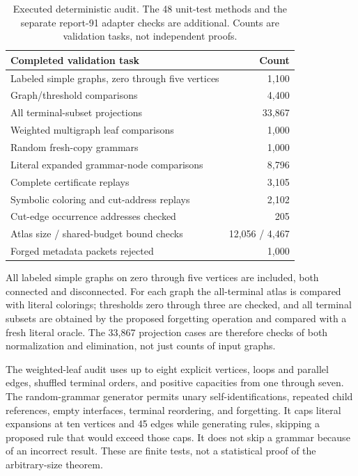 \documentclass[11pt,letterpaper]{article}
\theoremstyle{definition}
\theoremstyle{remark}\newtheorem{remark}[theorem]{Remark}
\begin{document}
\begin{table}[htbp]
\centering\small
\begin{tabular}{@{}lr@{}}
\toprule
Completed validation task & Count\\
\midrule
Labeled simple graphs, zero through five vertices & 1,100\\
Graph/threshold comparisons & 4,400\\
All terminal-subset projections & 33,867\\
Weighted multigraph leaf comparisons & 1,000\\
Random fresh-copy grammars & 1,000\\
Literal expanded grammar-node comparisons & 8,796\\
Complete certificate replays & 3,105\\
Symbolic coloring and cut-address replays & 2,102\\
Cut-edge occurrence addresses checked & 205\\
Atlas size / shared-budget bound checks & 12,056 / 4,467\\
Forged metadata packets rejected & 1,000\\
\bottomrule
\end{tabular}
\caption{Executed deterministic audit. The 48 unit-test methods and the separate report-91 adapter checks are additional. Counts are validation tasks, not independent proofs.}
\label{tab:audit}
\end{table}

All labeled simple graphs on zero through five vertices are included, both connected and disconnected. For each graph the all-terminal atlas is compared with literal colorings; thresholds zero through three are checked, and all terminal subsets are obtained by the proposed forgetting operation and compared with a fresh literal oracle. The 33,867 projection cases are therefore checks of both normalization and elimination, not just counts of input graphs.

The weighted-leaf audit uses up to eight explicit vertices, loops and parallel edges, shuffled terminal orders, and positive capacities from one through seven. The random-grammar generator permits unary self-identifications, repeated child references, empty interfaces, terminal reordering, and forgetting. It caps literal expansions at ten vertices and 45 edges while generating rules, skipping a proposed rule that would exceed those caps. It does not skip a grammar because of an incorrect result. These are finite tests, not a statistical proof of the arbitrary-size theorem.
\end{document}
